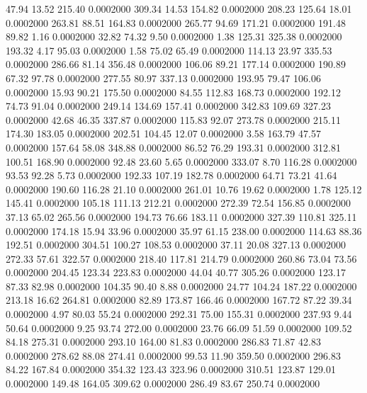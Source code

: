   47.94   13.52  215.40   0.0002000
 309.34   14.53  154.82   0.0002000
 208.23  125.64   18.01   0.0002000
 263.81   88.51  164.83   0.0002000
 265.77   94.69  171.21   0.0002000
 191.48   89.82    1.16   0.0002000
  32.82   74.32    9.50   0.0002000
   1.38  125.31  325.38   0.0002000
 193.32    4.17   95.03   0.0002000
   1.58   75.02   65.49   0.0002000
 114.13   23.97  335.53   0.0002000
 286.66   81.14  356.48   0.0002000
 106.06   89.21  177.14   0.0002000
 190.89   67.32   97.78   0.0002000
 277.55   80.97  337.13   0.0002000
 193.95   79.47  106.06   0.0002000
  15.93   90.21  175.50   0.0002000
  84.55  112.83  168.73   0.0002000
 192.12   74.73   91.04   0.0002000
 249.14  134.69  157.41   0.0002000
 342.83  109.69  327.23   0.0002000
  42.68   46.35  337.87   0.0002000
 115.83   92.07  273.78   0.0002000
 215.11  174.30  183.05   0.0002000
 202.51  104.45   12.07   0.0002000
   3.58  163.79   47.57   0.0002000
 157.64   58.08  348.88   0.0002000
  86.52   76.29  193.31   0.0002000
 312.81  100.51  168.90   0.0002000
  92.48   23.60    5.65   0.0002000
 333.07    8.70  116.28   0.0002000
  93.53   92.28    5.73   0.0002000
 192.33  107.19  182.78   0.0002000
  64.71   73.21   41.64   0.0002000
 190.60  116.28   21.10   0.0002000
 261.01   10.76   19.62   0.0002000
   1.78  125.12  145.41   0.0002000
 105.18  111.13  212.21   0.0002000
 272.39   72.54  156.85   0.0002000
  37.13   65.02  265.56   0.0002000
 194.73   76.66  183.11   0.0002000
 327.39  110.81  325.11   0.0002000
 174.18   15.94   33.96   0.0002000
  35.97   61.15  238.00   0.0002000
 114.63   88.36  192.51   0.0002000
 304.51  100.27  108.53   0.0002000
  37.11   20.08  327.13   0.0002000
 272.33   57.61  322.57   0.0002000
 218.40  117.81  214.79   0.0002000
 260.86   73.04   73.56   0.0002000
 204.45  123.34  223.83   0.0002000
  44.04   40.77  305.26   0.0002000
 123.17   87.33   82.98   0.0002000
 104.35   90.40    8.88   0.0002000
  24.77  104.24  187.22   0.0002000
 213.18   16.62  264.81   0.0002000
  82.89  173.87  166.46   0.0002000
 167.72   87.22   39.34   0.0002000
   4.97   80.03   55.24   0.0002000
 292.31   75.00  155.31   0.0002000
 237.93    9.44   50.64   0.0002000
   9.25   93.74  272.00   0.0002000
  23.76   66.09   51.59   0.0002000
 109.52   84.18  275.31   0.0002000
 293.10  164.00   81.83   0.0002000
 286.83   71.87   42.83   0.0002000
 278.62   88.08  274.41   0.0002000
  99.53   11.90  359.50   0.0002000
 296.83   84.22  167.84   0.0002000
 354.32  123.43  323.96   0.0002000
 310.51  123.87  129.01   0.0002000
 149.48  164.05  309.62   0.0002000
 286.49   83.67  250.74   0.0002000
